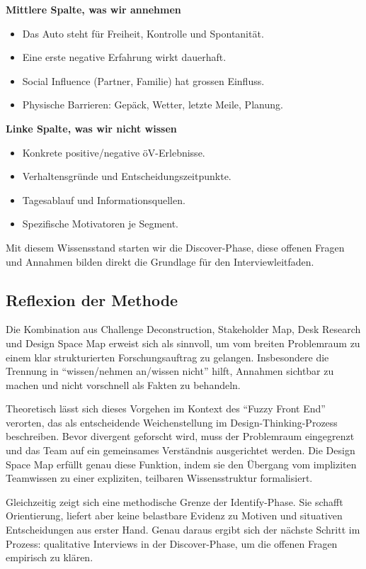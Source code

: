 \textbf{Mittlere Spalte, was wir annehmen}
\begin{itemize}
  \item Das Auto steht für Freiheit, Kontrolle und Spontanität.
  \item Eine erste negative Erfahrung wirkt dauerhaft.
  \item Social Influence (Partner, Familie) hat grossen Einfluss.
  \item Physische Barrieren: Gepäck, Wetter, letzte Meile, Planung.
\end{itemize}

\textbf{Linke Spalte, was wir nicht wissen}
\begin{itemize}
  \item Konkrete positive/negative öV-Erlebnisse.
  \item Verhaltensgründe und Entscheidungszeitpunkte.
  \item Tagesablauf und Informationsquellen.
  \item Spezifische Motivatoren je Segment.
\end{itemize}

Mit diesem Wissensstand starten wir die Discover-Phase, diese offenen Fragen und Annahmen bilden direkt die Grundlage für den Interviewleitfaden.

\columnbreak
\subsection{Reflexion der Methode}

Die Kombination aus Challenge Deconstruction, Stakeholder Map, Desk Research und Design Space Map erweist sich als sinnvoll, um vom breiten Problemraum zu einem klar strukturierten Forschungsauftrag zu gelangen.
Insbesondere die Trennung in ``wissen/nehmen an/wissen nicht'' hilft, Annahmen sichtbar zu machen und nicht vorschnell als Fakten zu behandeln.

Theoretisch lässt sich dieses Vorgehen im Kontext des ``Fuzzy Front End'' verorten, das \textcite{lewrick2018} als entscheidende Weichenstellung im Design-Thinking-Prozess beschreiben.
Bevor divergent geforscht wird, muss der Problemraum eingegrenzt und das Team auf ein gemeinsames Verständnis ausgerichtet werden.
Die Design Space Map erfüllt genau diese Funktion, indem sie den Übergang vom impliziten Teamwissen zu einer expliziten, teilbaren Wissensstruktur formalisiert.

Gleichzeitig zeigt sich eine methodische Grenze der Identify-Phase.
Sie schafft Orientierung, liefert aber keine belastbare Evidenz zu Motiven und situativen Entscheidungen aus erster Hand.
Genau daraus ergibt sich der nächste Schritt im Prozess: qualitative Interviews in der Discover-Phase, um die offenen Fragen empirisch zu klären.

